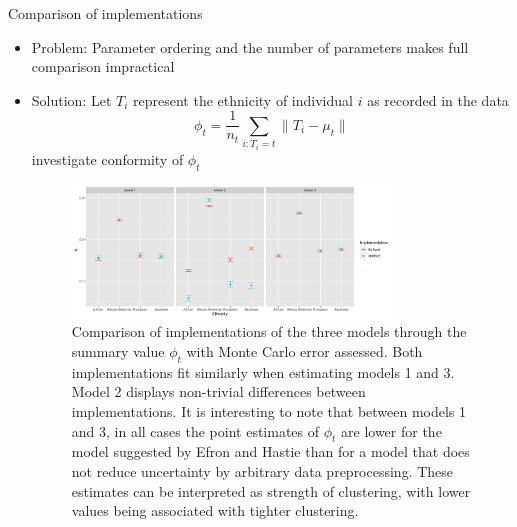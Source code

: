 \documentclass{beamer}
\begin{document}
\begin{frame}{Comparison of implementations}
\begin{itemize}
    \item \small{Problem: Parameter ordering and the number of parameters makes full comparison impractical}
    \item Solution: Let $T_i$ represent the ethnicity of individual $i$ as recorded in the data
\begin{equation*}
    \phi_t = \frac{1}{n_t} \sum_{i: T_i = t} \lVert T_i - \mu_t \rVert
\end{equation*}
    investigate conformity of $\phi_t$
    
    \begin{figure}[h]
	\centering \includegraphics[width=0.8\textwidth]{SemesterProject/model_comp.png}
	\caption{\tiny{Comparison of implementations of the three models through the summary value $\phi_t$ with Monte Carlo error assessed. Both implementations fit similarly when estimating models 1 and 3. Model 2 displays non-trivial differences between implementations. It is interesting to note that between models 1 and 3, in all cases the point estimates of $\phi_t$ are lower for the model suggested by Efron and Hastie than for a model that does not reduce uncertainty by arbitrary data preprocessing. These estimates can be interpreted as strength of clustering, with lower values being associated with tighter clustering.}}
	\label{fig:model_comp}
\end{figure}
\end{itemize}
\end{frame}
\end{document}
